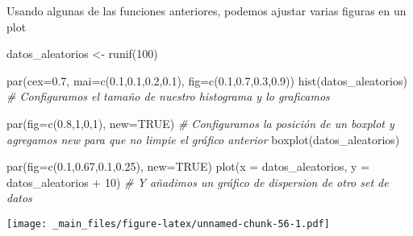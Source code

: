 \documentclass[
]{book}
\newenvironment{Shaded}{\begin{snugshade}}{\end{snugshade}}
\newcommand{\AttributeTok}[1]{\textcolor[rgb]{0.77,0.63,0.00}{#1}}
\newcommand{\CommentTok}[1]{\textcolor[rgb]{0.56,0.35,0.01}{\textit{#1}}}
\newcommand{\ConstantTok}[1]{\textcolor[rgb]{0.00,0.00,0.00}{#1}}
\newcommand{\DecValTok}[1]{\textcolor[rgb]{0.00,0.00,0.81}{#1}}
\newcommand{\FloatTok}[1]{\textcolor[rgb]{0.00,0.00,0.81}{#1}}
\newcommand{\FunctionTok}[1]{\textcolor[rgb]{0.00,0.00,0.00}{#1}}
\newcommand{\NormalTok}[1]{#1}
\newcommand{\OtherTok}[1]{\textcolor[rgb]{0.56,0.35,0.01}{#1}}
\newcommand{\SpecialCharTok}[1]{\textcolor[rgb]{0.00,0.00,0.00}{#1}}
\begin{document}
Usando algunas de las funciones anteriores, podemos ajustar varias figuras en un plot

\begin{Shaded}
\begin{Highlighting}[]
\NormalTok{datos\_aleatorios }\OtherTok{\textless{}{-}} \FunctionTok{runif}\NormalTok{(}\DecValTok{100}\NormalTok{)}

\FunctionTok{par}\NormalTok{(}\AttributeTok{cex=}\FloatTok{0.7}\NormalTok{, }\AttributeTok{mai=}\FunctionTok{c}\NormalTok{(}\FloatTok{0.1}\NormalTok{,}\FloatTok{0.1}\NormalTok{,}\FloatTok{0.2}\NormalTok{,}\FloatTok{0.1}\NormalTok{), }\AttributeTok{fig=}\FunctionTok{c}\NormalTok{(}\FloatTok{0.1}\NormalTok{,}\FloatTok{0.7}\NormalTok{,}\FloatTok{0.3}\NormalTok{,}\FloatTok{0.9}\NormalTok{))}
\FunctionTok{hist}\NormalTok{(datos\_aleatorios) }\CommentTok{\# Configuramos el tamaño de nuestro histograma y lo graficamos}

\FunctionTok{par}\NormalTok{(}\AttributeTok{fig=}\FunctionTok{c}\NormalTok{(}\FloatTok{0.8}\NormalTok{,}\DecValTok{1}\NormalTok{,}\DecValTok{0}\NormalTok{,}\DecValTok{1}\NormalTok{), }\AttributeTok{new=}\ConstantTok{TRUE}\NormalTok{) }\CommentTok{\# Configuramos la posición de un boxplot y agregamos new para que no limpie el gráfico anterior}
\FunctionTok{boxplot}\NormalTok{(datos\_aleatorios)}

\FunctionTok{par}\NormalTok{(}\AttributeTok{fig=}\FunctionTok{c}\NormalTok{(}\FloatTok{0.1}\NormalTok{,}\FloatTok{0.67}\NormalTok{,}\FloatTok{0.1}\NormalTok{,}\FloatTok{0.25}\NormalTok{), }\AttributeTok{new=}\ConstantTok{TRUE}\NormalTok{)}
\FunctionTok{plot}\NormalTok{(}\AttributeTok{x =}\NormalTok{ datos\_aleatorios, }\AttributeTok{y =}\NormalTok{ datos\_aleatorios }\SpecialCharTok{+} \DecValTok{10}\NormalTok{) }\CommentTok{\# Y añadimos un gráfico de dispersion de otro set de datos}
\end{Highlighting}
\end{Shaded}

\texttt{[image: \_main\_files/figure-latex/unnamed-chunk-56-1.pdf]}

  
\end{document}
